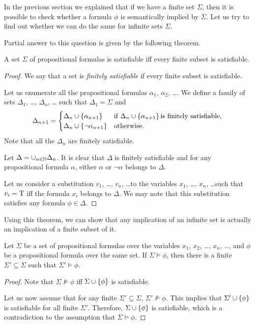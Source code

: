 In the previous section we explained that if we have a finite set $\Sigma$,
then it is possible to check whether a formula $\phi$ is semantically implied
by $\Sigma$. Let us try to find out whether we can do the same for infinite
sets $\Sigma$.

Partial answer to this question is given by the following theorem.
\begin{theorem}
  A set $\Sigma$ of propositional formulas is satisfiable iff every finite
  subset is satisfiable.
\end{theorem}
\begin{proof}
  We say that a set is \emph{finitely satisfiable} if every finite subset
  is satisfiable.

  Let us enumerate all the propositional formulas $\alpha_1$, $\alpha_2$, \dots.
  We define a family of sets $\Delta_1$, \dots, $\Delta_n$, \dots
  such that $\Delta_1 = \Sigma$ and
  \[
    \Delta_{n + 1} =
    \begin{cases}
      \Delta_n \cup \set{\alpha_{n + 1}} & \text{if }
        \Delta_n \cup \set{\alpha_{n + 1}} \text{is finitely satisfiable,} \\
      \Delta_n \cup \set{\lnot \alpha_{n + 1}} & \text{otherwise.}
    \end{cases}
  \]
  Note that all the $\Delta_n$ are finitely satisfiable.

  Let $\Delta = \cup_{n \in {\mathbb{N}}} \Delta_n$. It is clear that $\Delta$ is
  finitely satisfiable and for any propositional formula $\alpha$,
  either $\alpha$ or $\lnot \alpha$ belongs to $\Delta$.

  Let us consider a substitution $v_1$, \dots, $v_n$, \dots to the variables
  $x_1$, \dots, $x_n$, \dots such that $v_i = \text{T}$ iff the formula $x_i$
  belongs to $\Delta$. We may note that this substitution satisfies any
  formula $\phi \in \Delta$.
\end{proof}

Using this theorem, we can show that any implication of an infinite set is
actually an implication of a finite subset of it.
\begin{corollary}
  Let $\Sigma$ be a set of propositional formulas over the variables
  $x_1$, $x_2$, \dots, $x_n$, \dots, and $\phi$ be a propositional formula
  over the same set. If $\Sigma \models \phi$, then there is a finite
  $\Sigma' \subseteq \Sigma$ such that $\Sigma' \models \phi$.
\end{corollary}
\begin{proof}
  Note that $\Sigma \not\models \phi$ iff $\Sigma \cup \set{\phi}$ is
  satisfiable.

  Let us now assume that for any finite $\Sigma' \subseteq \Sigma$,
  $\Sigma' \not\models \phi$. This implies that $\Sigma' \cup \set{\phi}$
  is satisfiable for all finite $\Sigma'$. Therefore, $\Sigma \cup \set{\phi}$
  is satisfiable, which is a contradiction to the assumption that
  $\Sigma \models \phi$.
\end{proof}

